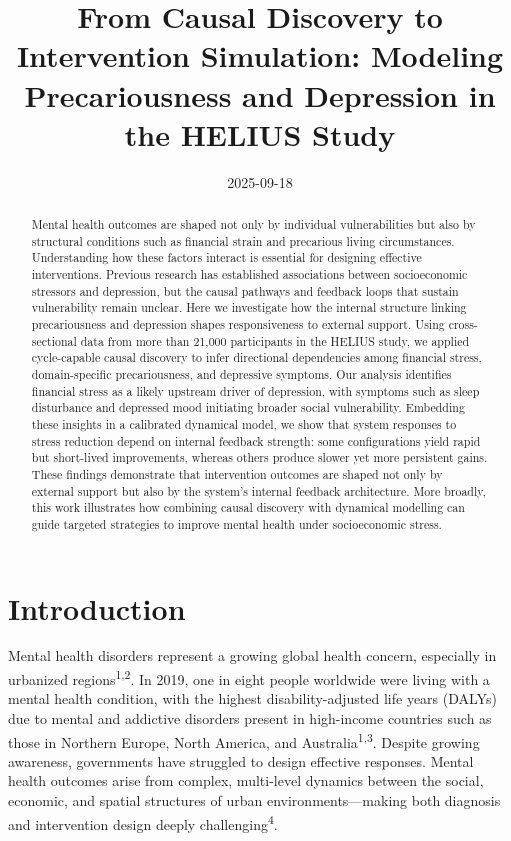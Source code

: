 \documentclass[
]{article}
\title{From Causal Discovery to Intervention Simulation: Modeling
Precariousness and Depression in the HELIUS Study}
\author{%
}
\date{2025-09-18}
\begin{document}
\maketitle
\begin{abstract}
\noindent Mental health outcomes are shaped not only by individual
vulnerabilities but also by structural conditions such as financial
strain and precarious living circumstances. Understanding how these
factors interact is essential for designing effective interventions.
Previous research has established associations between socioeconomic
stressors and depression, but the causal pathways and feedback loops
that sustain vulnerability remain unclear. Here we investigate how the
internal structure linking precariousness and depression shapes
responsiveness to external support. Using cross-sectional data from more
than 21,000 participants in the HELIUS study, we applied cycle-capable
causal discovery to infer directional dependencies among financial
stress, domain-specific precariousness, and depressive symptoms. Our
analysis identifies financial stress as a likely upstream driver of
depression, with symptoms such as sleep disturbance and depressed mood
initiating broader social vulnerability. Embedding these insights in a
calibrated dynamical model, we show that system responses to stress
reduction depend on internal feedback strength: some configurations
yield rapid but short-lived improvements, whereas others produce slower
yet more persistent gains. These findings demonstrate that intervention
outcomes are shaped not only by external support but also by the
system's internal feedback architecture. More broadly, this work
illustrates how combining causal discovery with dynamical modelling can
guide targeted strategies to improve mental health under socioeconomic
stress.
\end{abstract}


\section{Introduction}\label{introduction}

Mental health disorders represent a growing global health concern,
especially in urbanized regions\textsuperscript{1,2}. In 2019, one in
eight people worldwide were living with a mental health condition, with
the highest disability-adjusted life years (DALYs) due to mental and
addictive disorders present in high-income countries such as those in
Northern Europe, North America, and Australia\textsuperscript{1,3}.
Despite growing awareness, governments have struggled to design
effective responses. Mental health outcomes arise from complex,
multi-level dynamics between the social, economic, and spatial
structures of urban environments---making both diagnosis and
intervention design deeply challenging\textsuperscript{4}.
\end{document}
